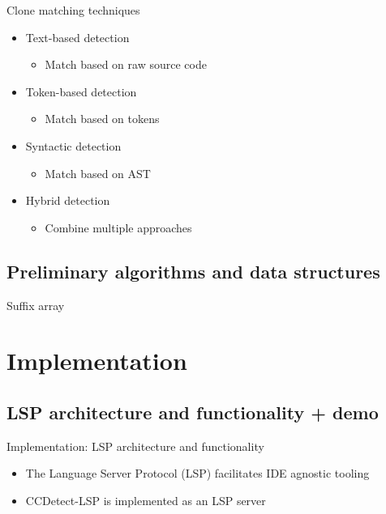 \documentclass[aspectratio=1610]{beamer}
\begin{document}
\begin{frame}{Clone matching techniques}
    \begin{itemize}
        \item Text-based detection
            \begin{itemize}
                \item Match based on raw source code
            \end{itemize}
        \item Token-based detection
            \begin{itemize}
                \item Match based on tokens
            \end{itemize}
        \item Syntactic detection
            \begin{itemize}
                \item Match based on AST
            \end{itemize}
        \item Hybrid detection
            \begin{itemize}
                \item Combine multiple approaches
            \end{itemize}
    \end{itemize}
\end{frame}


\subsection{Preliminary algorithms and data structures}
\begin{frame}{Suffix array}
\end{frame}

\section{Implementation}

\subsection{LSP architecture and functionality + demo}

\begin{frame}{Implementation: LSP architecture and functionality}
	\begin{itemize}
		\item The Language Server Protocol (LSP) facilitates IDE agnostic tooling
		\item CCDetect-LSP is implemented as an LSP server
	\end{itemize}
\end{frame}
\end{document}
